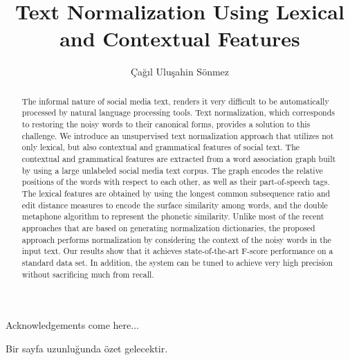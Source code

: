 \documentclass[a4paper,onesided,12pt]{report}
\title{Text Normalization Using Lexical and Contextual Features}
\author{Çağıl Uluşahin Sönmez}
\begin{document}
\makemstitle %
\makeapprovalpage
\begin{acknowledgements}
Acknowledgements come here...
\end{acknowledgements}
\begin{abstract}
The informal nature of social media text, renders it very difficult to be automatically processed by natural language processing tools. Text normalization, which corresponds to restoring the noisy words to their canonical forms, provides a solution to this challenge.
We introduce an unsupervised text normalization approach that utilizes not only lexical, but also contextual and grammatical features of social text.
The contextual and grammatical features are extracted from a word association graph built by using a large unlabeled social media text corpus.
The graph encodes the relative positions of the words with respect to each other, as well as their part-of-speech tags.
The lexical features are obtained by using the longest common subsequence ratio and edit distance measures to encode the surface similarity among words, and the double metaphone algorithm to represent the phonetic similarity. Unlike most of the recent approaches that are based on generating normalization dictionaries, the proposed approach performs normalization by considering the context of the noisy words in the input text.
Our results show that it achieves state-of-the-art F-score performance on a standard data set. In addition, the system can be tuned to achieve very high precision without sacrificing much from recall.
\end{abstract}
\begin{ozet}
Bir sayfa uzunluğunda özet gelecektir.
\end{ozet}
\tableofcontents
\listoffigures
\listoftables
\begin{symbols}
%
\sym{ }{}
\end{symbols}
\end{document}
